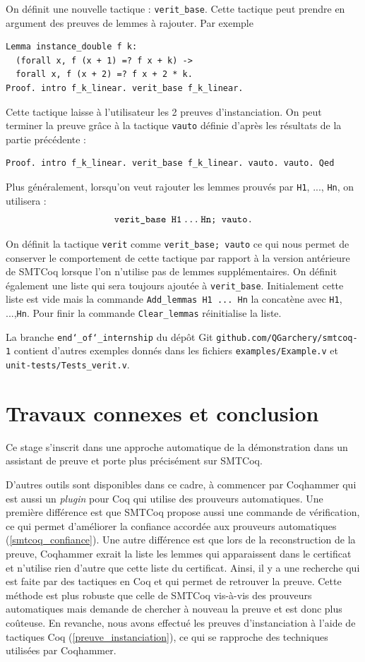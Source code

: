 \documentclass[11pt]{article}
\begin{document}
On définit une nouvelle tactique : \texttt{verit\_base}. Cette tactique peut prendre en argument des preuves de lemmes à rajouter. Par exemple 
\begin{lstlisting}[frame=single]
Lemma instance_double f k:
  (forall x, f (x + 1) =? f x + k) ->
  forall x, f (x + 2) =? f x + 2 * k.
Proof. intro f_k_linear. verit_base f_k_linear.
\end{lstlisting}
Cette tactique laisse à l'utilisateur les 2 preuves d'instanciation. On peut terminer la preuve grâce à la tactique \texttt{vauto} définie d'après les résultats de la partie précédente : 
\begin{lstlisting}[frame=single]
Proof. intro f_k_linear. verit_base f_k_linear. vauto. vauto. Qed
\end{lstlisting}
Plus généralement, lorsqu'on veut rajouter les lemmes prouvés par \texttt{H1}, ..., \texttt{Hn}, on utilisera : 
\[\texttt{verit\_base H1\,...\,Hn; vauto.}\]

On définit la tactique \texttt{verit} comme \texttt{verit\_base; vauto} ce qui nous permet de conserver le comportement de cette tactique par rapport à la version antérieure de SMTCoq lorsque l'on n'utilise pas de lemmes supplémentaires. On définit également une liste qui sera toujours ajoutée à \texttt{verit\_base}. Initialement cette liste est vide mais la commande \texttt{Add\_lemmas H1\,...\,Hn} la concatène avec \texttt{H1}, ...,\texttt{Hn}. Pour finir la commande \texttt{Clear\_lemmas} réinitialise la liste. 

La branche \texttt{end\char`_of\char`_internship} du dépôt Git \texttt{github.com/QGarchery/smtcoq-1} contient d'autres exemples donnés dans les fichiers \texttt{examples/Example.v} et \texttt{unit-tests/Tests\_verit.v}.


\section{Travaux connexes et conclusion}

Ce stage s'inscrit dans une approche automatique de la démonstration dans un assistant de preuve et porte plus précisément sur SMTCoq. 

D'autres outils sont disponibles dans ce cadre, à commencer par Coqhammer \cite{coqhammer} qui est aussi un \textit{plugin} pour Coq qui utilise des prouveurs automatiques. Une première différence est que SMTCoq propose aussi une commande de vérification, ce qui permet d'améliorer la confiance accordée aux prouveurs automatiques (\ref{smtcoq_confiance}). Une autre différence est que lors de la reconstruction de la preuve, Coqhammer exrait la liste les lemmes qui apparaissent dans le certificat et n'utilise rien d'autre que cette liste du certificat. Ainsi, il y a une recherche qui est faite par des tactiques en Coq et qui permet de retrouver la preuve. Cette méthode est plus robuste que celle  de SMTCoq vis-à-vis des prouveurs automatiques mais demande de chercher à nouveau la preuve et est donc plus coûteuse. En revanche, nous avons effectué les preuves d'instanciation  à l'aide de tactiques Coq (\ref{preuve_instanciation}), ce qui se rapproche des techniques utilisées par Coqhammer. 
\end{document}
